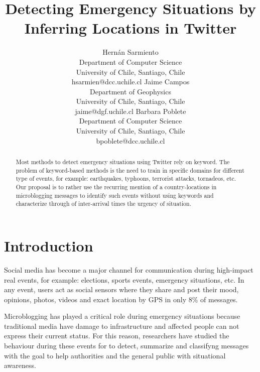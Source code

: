 \documentclass[letterpaper]{article} %
\begin{document}
%
\title{Detecting Emergency Situations by Inferring Locations in Twitter}
\author{Hern\'an Sarmiento\\ Department of Computer Science \\ University of Chile, Santiago, Chile \\ hsarmien@dcc.uchile.cl
	\And Jaime Campos \\ Department of Geophysics \\ University of Chile, Santiago, Chile \\ jaime@dgf.uchile.cl
	\And Barbara Poblete\\ Department of Computer Science \\ University of Chile, Santiago, Chile \\ bpoblete@dcc.uchile.cl
}

\maketitle
\begin{abstract}
Most methods to detect emergency situations using Twitter rely on keyword. The problem of keyword-based methods is the need to train in specific domains for different type of events, for example: earthquakes, typhoons, terrorist attacks, tornadeos, etc.
Our proposal is to rather use the recurring mention of a country-locations in microblogging messages to identify such events without using keywords and characterize through of inter-arrival times the urgency of situation.
\end{abstract}

\noindent
\section{Introduction}

Social media has become a major channel for communication during high-impact real events, for example: elections, sports events, emergency situations, etc. In any event, users act as social sensors where they share and post their mood, opinions, photos, videos and exact location by GPS in only $8\%$ of messages.

Microblogging has played a critical role during emergency situations because traditional media have damage to infrastructure and affected people can not express their current status. For this reason, researchers have studied the behaviour during these events for to detect, summarize and classifyng messages with the goal to help authorities and the general public with situational awareness.
\end{document}
